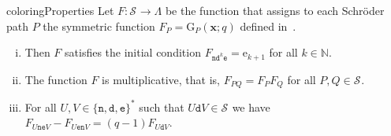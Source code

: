 \documentclass[reqno]{amsart}
\newcommand{\myi}[1]{\item\label{Item:#1}}
\newcommand{\setN}{\mathbb{N}}
\newcommand{\xvec}{\mathbf{x}}
\newcommand{\estep}{\texttt{e}}
\newcommand{\dstep}{\texttt{d}}
\newcommand{\nstep}{\texttt{n}}
\newcommand{\elementaryE}{\mathrm{e}}
\newcommand{\LLT}{\mathrm{G}}
\newcommand{\SCH}[1]{\mathcal{S}_{#1}}     %
\begin{document}
\begin{prop}{coloringProperties}
Let $F:\SCH{}\to\Lambda$ be the function 
that assigns to each Schr{\"o}der path $P$ the symmetric 
function $F_P=\LLT_P(\xvec;q)$ defined in~.
\begin{enumerate}[(i)]
\myi{coloring:init}
Then $F$ satisfies the initial condition $F_{\nstep\dstep^k\estep}=\elementaryE_{k+1}$ for all $k\in\setN$.

\myi{coloring:mult}
The function $F$ is multiplicative, that is, $F_{PQ} = F_P F_Q$ for all $P,Q\in\SCH{}$.

\myi{coloring:unicellular}
For all $U,V\in\{\nstep,\dstep,\estep\}^*$ such that $U\dstep V\in\SCH{}$ we have
$F_{U\nstep\estep V} - F_{U\estep\nstep V} = (q-1) F_{U\dstep V}$.
\end{enumerate}
\end{prop}
\end{document}
